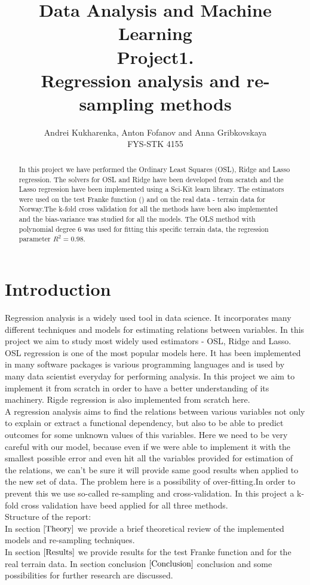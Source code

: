 \documentclass[10pt]{article}
\begin{document}
\setlength\parindent{1pt}
\title{Data Analysis and Machine Learning \\
Project1.\\ Regression analysis and re-sampling methods}
\author{Andrei Kukharenka, Anton Fofanov and Anna Gribkovskaya \\  
FYS-STK 4155 
}

\maketitle
\begin{abstract}
In this project we have performed the Ordinary Least Squares (OSL), Ridge and Lasso regression. The solvers for OSL and Ridge have been developed from scratch and the Lasso regression have been implemented using a Sci-Kit learn library. The estimators were used on the test Franke function (\cite{Franke}) and on the real data - terrain data for Norway.The k-fold cross validation for all the methods have been also implemented and the bias-variance was studied for all the models. The OLS method with polynomial degree $6$ was used for fitting  this specific terrain data, the regression parameter $R^2=0.98$.
\end{abstract}
\clearpage 


\section*{Introduction}
Regression analysis is a widely used tool in data science. It incorporates many different techniques and models for estimating relations between variables. In this project we aim to study most widely used estimators - OSL, Ridge and Lasso.
OSL regression is one of the most popular models here. It has been implemented in many software packages is various programming languages and is used by many data scientist everyday for performing analysis. In this project we aim to implement it from scratch in order to have a better understanding of its machinery. Rigde regression is also implemented from scratch here. \\
A regression analysis aims to find the relations between various variables not only to explain or extract a functional dependency, but also to be able to predict outcomes for some unknown values of this variables. Here we need to be very careful with our model, because even if we were able to implement it with the smallest possible error and even hit all the variables provided for estimation of the relations, we can't be sure it will provide same good results when applied to the new set of data. The problem here is a possibility of over-fitting.In order to prevent this we use so-called re-sampling and cross-validation. In this project a k-fold cross validation have beed applied for all three methods. \\
Structure of the report:\\
In section $\ref{Theory}$ we provide a brief theoretical review of the implemented models and re-sampling techniques.\\
In section $\ref{Results}$ we provide results for the test Franke function and for the real terrain data.
In section conclusion $\ref{Conclusion}$ conclusion and some possibilities for further research are discussed.
\end{document}
